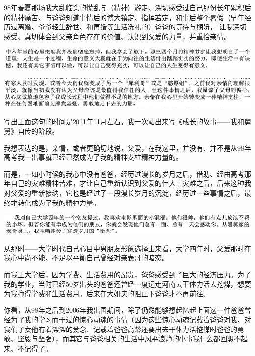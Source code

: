 \documentclass[9pt, b5paper]{article}
\begin{document}
98年春夏那场我大乱临头的慌乱与（精神）游走、深切感受过自己那份长年累积后的精神痛苦、与爸爸知道事情后的博大镇定、指挥若定，和事后整个暑假（早年经历过离婚、爷爷轻生辞世、和再婚等生活洗礼的）爸爸的等待与期盼，
让我深切感受、真切体会到父亲角色存在的价值、认识到父爱的力量，并重拾亲情。

\begin{center}
\includegraphics[width=.9\linewidth]{./pic/backups_plans_20210422_174832.png}
\end{center}

\begin{center}
\includegraphics[width=.9\linewidth]{./pic/backups_plans_20210422_174916.png}
\end{center}

写出上面这句的时间是2011年11月左右，我一次站出来写《成长的故事——我和舅舅》自传的阶段。

我想表达的是，亲情，或者更确切地说，父爱，在我这里，并没有、并不是从98年高考我一出事就已经已然成为了我的精神支柱精神力量的。

而是，一如小时候的我心中没有爸爸，经历过漫长的岁月之后，借助、经由高考那年自己的灾难精神苦难，才让自己重新认识到父爱的伟大；灾难之后，后来这种我对父爱的重新接纳，它也是经过了一段漫长岁月的沉淀，经历过一些事情之后，最终才转化成为了我的精神力量。 

\begin{center}
\includegraphics[width=.9\linewidth]{./pic/backups_plans_20210422_223545.png}
\end{center}

从那时——大学时代自己心目中男朋友形象选择上来看，大学四年时，父爱那时在我心中尚不能、不足以平衡自己曾经对亲表哥的暗恋。

而我上大学后，因为学费、生活费用的昂贵，爸爸感受到了巨大的经济压力。为了我的学业，当时已经50岁出头的爸爸还曾经一度远走河南去干体力活去挖煤，想要为我挣得学费和生活费用。后来在大姐夫的阻止下爸爸才不再前往。

你看，从98年之后到2006年我出国期间，除了仍然能够想起忆起上面这一件爸爸曾经为了我的学习而干过的惊心动魂的事情（因为这些惊心动魂记载着爸爸对我、对我们子女他有着深深的爱念、记载着爸爸高龄还要出去干体力活挖煤时爸爸的勇敢、坚毅与坚强），而其它与爸爸相关的生活中风平浪静的小事我什么都回想不起来、不记得了。
\end{document}
